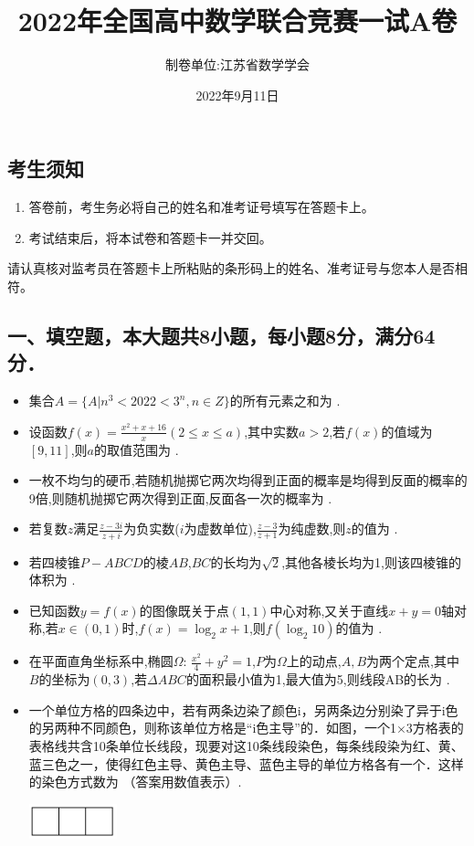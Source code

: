 \documentclass[10pt,a4paper]{ctexart}
\title{\Large{\textbf{2022年全国高中数学联合竞赛一试A卷}}}
\date{2022年9月11日}
\author{制卷单位:江苏省数学学会}
\newcommand{\tk}[1][2.5]{\,\underline{\mbox{\hspace{#1 cm}}}\,}
\begin{document}
	\maketitle
	\subsection*{考生须知}
	\begin{enumerate}
		\item 答卷前，考生务必将自己的姓名和准考证号填写在答题卡上。
		\item 考试结束后，将本试卷和答题卡一并交回。
	\end{enumerate}
	请认真核对监考员在答题卡上所粘贴的条形码上的姓名、准考证号与您本人是否相符。	
	\subsection*{一、填空题，本大题共8小题，每小题8分，满分64分．}
	\begin{spacing}{1.8}
		\begin{itemize}
			\item[1.] 集合$A=\{A|n^3<2022<3^n,n\in Z\}$的所有元素之和为\tk.
			\item[2.] 设函数$f(x)=\frac{x^2+x+16}{x}(2\leq x\leq a)$,其中实数$a>2$,若$f(x)$的值域为$[9,11]$,则$a$的取值范围为\tk.
			\item[3.] 一枚不均匀的硬币,若随机抛掷它两次均得到正面的概率是均得到反面的概率的9倍,则随机抛掷它两次得到正面,反面各一次的概率为\tk. 
			\item[4.] 若复数$z$满足$\frac{z-3i}{z+i}$为负实数($i$为虚数单位),$\frac{z-3}{z+1}$为纯虚数,则$z$的值为\tk.
			\item[5.] 若四棱锥$P-ABCD$的棱$AB$,$BC$的长均为$\sqrt{2}$,其他各棱长均为1,则该四棱锥的体积为\tk.
			\item[6.]已知函数$y=f(x)$的图像既关于点$(1,1)$中心对称,又关于直线$x+y=0$轴对称,若$x\in (0,1)$时,$f(x)=\log_2{x+1}$,则$f(\log_2{10})$的值为\tk.
			\item[7.]在平面直角坐标系中,椭圆$\Omega$: $\frac{x^2}{4}+y^2=1$,$P$为$\Omega$上的动点,$A,B$为两个定点,其中$B$的坐标为$(0,3)$,若$\Delta ABC$的面积最小值为1,最大值为5,则线段AB的长为\tk.
			\item[8.]一个单位方格的四条边中，若有两条边染了颜色i，另两条边分别染了异于i色的另两种不同颜色，则称该单位方格是“i色主导”的．如图，一个1$\times$3方格表的表格线共含10条单位长线段，现要对这10条线段染色，每条线段染为红、黄、蓝三色之一，使得红色主导、黄色主导、蓝色主导的单位方格各有一个．这样的染色方式数为\tk（答案用数值表示）.
			\begin{center}
				\includegraphics[width=0.2\textwidth]{tkt1.png}
			\end{center} 
		\end{itemize}
	\end{spacing}
	\newpage
	
\end{document}
